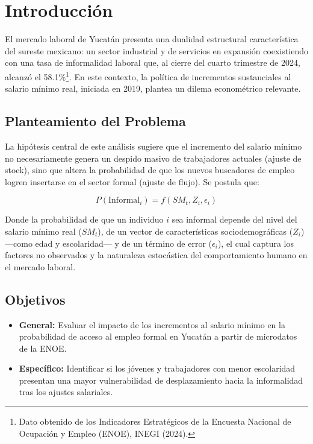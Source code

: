 \section{Introducción}

El mercado laboral de Yucatán presenta una dualidad 
estructural característica del sureste mexicano: un 
sector industrial y de servicios en expansión 
coexistiendo con una tasa de informalidad laboral que, 
al cierre del cuarto trimestre de 2024, alcanzó el 
58.1\%\footnote{Dato obtenido de los Indicadores Estratégicos 
de la Encuesta Nacional de Ocupación y Empleo (ENOE), INEGI (2024).}. 
En este contexto, la política de incrementos sustanciales
al salario mínimo real, iniciada en 2019, plantea 
un dilema econométrico relevante.

\subsection{Planteamiento del Problema}
La hipótesis central de este análisis 
sugiere que el incremento del salario mínimo 
no necesariamente genera un despido masivo de 
trabajadores actuales (ajuste de stock), sino 
que altera la probabilidad de que los nuevos 
buscadores de empleo logren insertarse en el 
sector formal (ajuste de flujo). Se postula que:

\begin{equation}
P(\text{Informal}_i) = f(SM_t, Z_i, \epsilon_i)
\end{equation}

Donde la probabilidad de que un individuo $i$ sea informal 
depende del nivel del salario mínimo real ($SM_t$), de un 
vector de características sociodemográficas ($Z_i$) ---como edad 
y escolaridad--- y de un término de error ($\epsilon_i$), el 
cual captura los factores no observados y la naturaleza estocástica 
del comportamiento humano en el mercado laboral.

\subsection{Objetivos}
\begin{itemize}
    \item \textbf{General:} Evaluar el impacto de los incrementos al salario mínimo en la probabilidad de acceso al empleo formal en Yucatán a partir de microdatos de la ENOE.
    \item \textbf{Específico:} Identificar si los jóvenes y trabajadores con menor escolaridad presentan una mayor vulnerabilidad de desplazamiento hacia la informalidad tras los ajustes salariales.
\end{itemize}